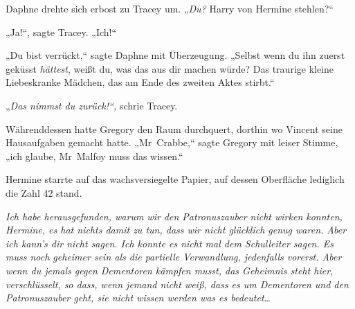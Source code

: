 Daphne drehte sich erbost zu Tracey um. „\emph{Du?} Harry von Hermine stehlen?“

„Ja!“, sagte Tracey. „Ich!“

„Du bist verrückt,“ sagte Daphne mit Überzeugung. „Selbst wenn du ihn zuerst geküsst \emph{hättest}, weißt du, was das aus dir machen würde? Das traurige kleine Liebeskranke Mädchen, das am Ende des zweiten Aktes stirbt.“

„\emph{Das nimmst du zurück!“,} schrie Tracey.

Währenddessen hatte Gregory den Raum durchquert, dorthin wo Vincent seine Hausaufgaben gemacht hatte. „Mr~Crabbe,“ sagte Gregory mit leiser Stimme, „ich glaube, Mr~Malfoy muss das wissen.“


Hermine starrte auf das wachsversiegelte Papier, auf dessen Oberfläche lediglich die Zahl 42 stand.

\emph{Ich habe herausgefunden, warum wir den Patronuszauber nicht wirken konnten, Hermine, es hat nichts damit zu tun, dass wir nicht glücklich genug waren. Aber ich kann’s dir nicht sagen. Ich konnte es nicht mal dem Schulleiter sagen. Es muss noch geheimer sein als die partielle Verwandlung, jedenfalls vorerst. Aber wenn du jemals gegen Dementoren kämpfen musst, das Geheimnis steht hier, verschlüsselt, so dass, wenn jemand nicht weiß, dass es um Dementoren und den Patronuszauber geht, sie nicht wissen werden was es bedeutet}…

